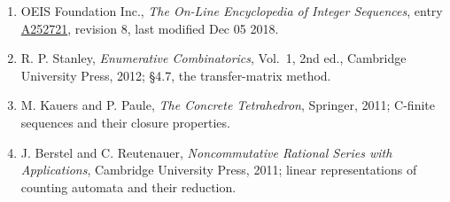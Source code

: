 \documentclass[11pt]{article}
\theoremstyle{definition}
\begin{document}
\begin{enumerate}

\item OEIS Foundation Inc., \emph{The On-Line Encyclopedia of Integer Sequences}, entry \href{https://oeis.org/A252721}{A252721}, revision 8, last modified Dec 05 2018.

\item R. P. Stanley, \emph{Enumerative Combinatorics}, Vol.~1, 2nd ed., Cambridge University Press, 2012; \S4.7, the transfer-matrix method.

\item M. Kauers and P. Paule, \emph{The Concrete Tetrahedron}, Springer, 2011; C-finite sequences and their closure properties.

\item J. Berstel and C. Reutenauer, \emph{Noncommutative Rational Series with Applications}, Cambridge University Press, 2011; linear representations of counting automata and their reduction.

\end{enumerate}
\end{document}
